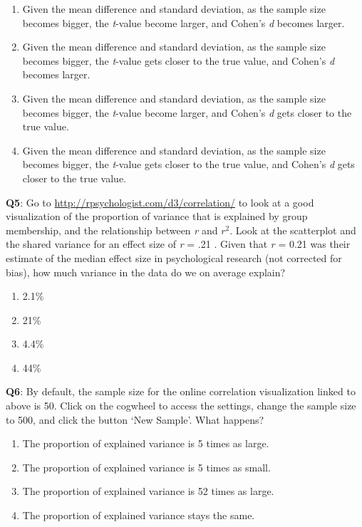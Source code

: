 \documentclass[
  oneside]{krantz}
\providecommand{\tightlist}{%
  \setlength{\itemsep}{0pt}\setlength{\parskip}{0pt}}
\begin{document}
\begin{enumerate}
\def\labelenumi{\Alph{enumi})}
\tightlist
\item
  Given the mean difference and standard deviation, as the sample size becomes bigger, the \emph{t}-value become larger, and Cohen's \emph{d} becomes larger.
\item
  Given the mean difference and standard deviation, as the sample size becomes bigger, the \emph{t}-value gets closer to the true value, and Cohen's \emph{d} becomes larger.
\item
  Given the mean difference and standard deviation, as the sample size becomes bigger, the \emph{t}-value become larger, and Cohen's \emph{d} gets closer to the true value.
\item
  Given the mean difference and standard deviation, as the sample size becomes bigger, the \emph{t}-value gets closer to the true value, and Cohen's \emph{d} gets closer to the true value.
\end{enumerate}

\textbf{Q5}: Go to \url{http://rpsychologist.com/d3/correlation/} to look at a good visualization of the proportion of variance that is explained by group membership, and the relationship between \emph{r} and \(r^2\). Look at the scatterplot and the shared variance for an effect size of \emph{r} = .21 \citep{richard_one_2003}. Given that \emph{r} = 0.21 was their estimate of the median effect size in psychological research (not corrected for bias), how much variance in the data do we on average explain?

\begin{enumerate}
\def\labelenumi{\Alph{enumi})}
\tightlist
\item
  2.1\%
\item
  21\%
\item
  4.4\%
\item
  44\%
\end{enumerate}

\textbf{Q6}: By default, the sample size for the online correlation visualization linked to above is 50. Click on the cogwheel to access the settings, change the sample size to 500, and click the button `New Sample'. What happens?

\begin{enumerate}
\def\labelenumi{\Alph{enumi})}
\tightlist
\item
  The proportion of explained variance is 5 times as large.
\item
  The proportion of explained variance is 5 times as small.
\item
  The proportion of explained variance is 52 times as large.
\item
  The proportion of explained variance stays the same.
\end{enumerate}
\end{document}
